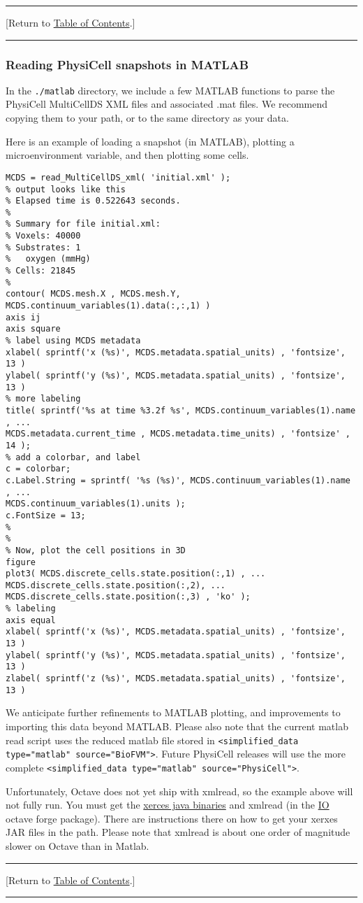 \documentclass[12pt]{article}
\renewcommand{\v}{\verb}
\newcommand{\TOClink}{\begin{center}\hrule\vskip-10pt\phantom{.}\hfill[Return to \hyperlink{TOC}{Table of Contents}.]\hfill\phantom{.}\vskip3pt\hrule\end{center}}
\begin{document}
\TOClink 

\subsubsection{Reading PhysiCell snapshots in MATLAB}
\label{sec:matlab_data}
In the \v|./matlab| directory, we include a few MATLAB functions to 
parse the PhysiCell MultiCellDS XML files and associated .mat files. 
We recommend copying them to your path, or to the same directory as 
your data. 

Here is an example of loading a snapshot (in MATLAB), 
plotting a microenvironment variable, and then plotting some cells. 
\begin{verbatim}
MCDS = read_MultiCellDS_xml( 'initial.xml' );
% output looks like this
% Elapsed time is 0.522643 seconds.
% 
% Summary for file initial.xml:
% Voxels: 40000
% Substrates: 1
%   oxygen (mmHg)
% Cells: 21845
%
contour( MCDS.mesh.X , MCDS.mesh.Y, MCDS.continuum_variables(1).data(:,:,1) )
axis ij
axis square
% label using MCDS metadata 
xlabel( sprintf('x (%s)', MCDS.metadata.spatial_units) , 'fontsize', 13 )
ylabel( sprintf('y (%s)', MCDS.metadata.spatial_units) , 'fontsize', 13 )
% more labeling 
title( sprintf('%s at time %3.2f %s', MCDS.continuum_variables(1).name , ...
MCDS.metadata.current_time , MCDS.metadata.time_units) , 'fontsize' , 14 );
% add a colorbar, and label 
c = colorbar; 
c.Label.String = sprintf( '%s (%s)', MCDS.continuum_variables(1).name , ...
MCDS.continuum_variables(1).units ); 
c.FontSize = 13; 
%
%
% Now, plot the cell positions in 3D
figure
plot3( MCDS.discrete_cells.state.position(:,1) , ... 
MCDS.discrete_cells.state.position(:,2), ...
MCDS.discrete_cells.state.position(:,3) , 'ko' ); 
% labeling 
axis equal 
xlabel( sprintf('x (%s)', MCDS.metadata.spatial_units) , 'fontsize', 13 )
ylabel( sprintf('y (%s)', MCDS.metadata.spatial_units) , 'fontsize', 13 )
zlabel( sprintf('z (%s)', MCDS.metadata.spatial_units) , 'fontsize', 13 )
\end{verbatim}

We anticipate further refinements to MATLAB plotting, and 
improvements to importing this data beyond MATLAB. Please also note 
that the current matlab read script uses the reduced matlab 
file stored in \v|<simplified_data type="matlab" source="BioFVM">|. 
Future PhysiCell releases will use the more complete 
\v|<simplified_data type="matlab" source="PhysiCell">|.

Unfortunately, Octave does not yet ship with xmlread, so the example 
above will not fully run. You must get the 
\href{http://xerces.apache.org/xerces-j/}{xerces java binaries} and 
xmlread (in the \href{https://octave.sourceforge.io/io/index.html}{IO} octave forge package). 
There are instructions there on how to get your xerxes JAR files in 
the path. Please note that xmlread is about one order of magnitude slower on 
Octave than in Matlab. 
\TOClink 
\end{document}
